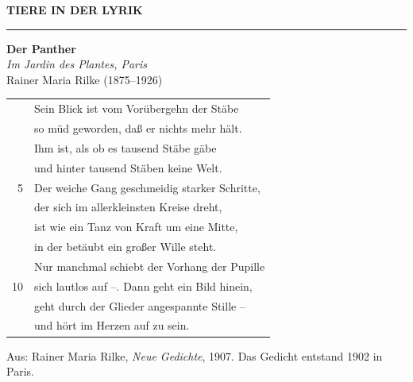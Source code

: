 \documentclass[11pt,a4paper]{article}
\begin{document}
{\sffamily\small\color{lesebuch}\textbf{TIERE IN DER LYRIK}}\\[-0.2em]
{\color{lesebuch}\rule{\linewidth}{0.8pt}}

\vspace{0.4em}
\begin{minipage}[t]{0.63\linewidth}\vspace{0pt}
{\Huge\bfseries Der Panther}\\[0.2em]
{\large\itshape Im Jardin des Plantes, Paris}\\[0.5em]
{\sffamily\small Rainer Maria Rilke (1875--1926)}

\vspace{1.4em}
\large
\renewcommand{\arraystretch}{1.28}
\begin{tabular}{@{}r@{\hspace{1.6em}}l@{}}
   & Sein Blick ist vom Vorübergehn der Stäbe \\
   & so müd geworden, daß er nichts mehr hält. \\
   & Ihm ist, als ob es tausend Stäbe gäbe \\
   & und hinter tausend Stäben keine Welt. \\[0.9em]
  \textcolor{lesebuch}{\sffamily\footnotesize 5} & Der weiche Gang geschmeidig starker Schritte, \\
   & der sich im allerkleinsten Kreise dreht, \\
   & ist wie ein Tanz von Kraft um eine Mitte, \\
   & in der betäubt ein großer Wille steht. \\[0.9em]
   & Nur manchmal schiebt der Vorhang der Pupille \\
  \textcolor{lesebuch}{\sffamily\footnotesize 10} & sich lautlos auf --. Dann geht ein Bild hinein, \\
   & geht durch der Glieder angespannte Stille -- \\
   & und hört im Herzen auf zu sein. \\
\end{tabular}
\normalsize

\vspace{1.0em}
{\sffamily\footnotesize Aus: Rainer Maria Rilke, \emph{Neue Gedichte}, 1907. Das Gedicht entstand 1902 in Paris.}
\end{minipage}\hfill
\end{document}
